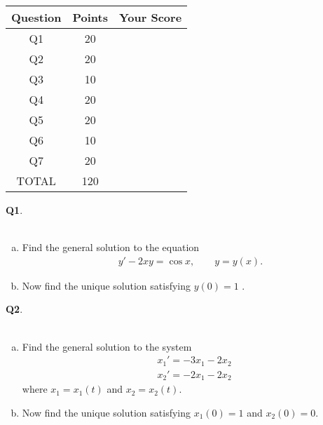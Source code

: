 \documentclass[12pt, oneside]{amsart}
\newcommand{\one}{20}
\newcommand{\two}{20}
\newcommand{\three}{10}
\newcommand{\four}{20}
\newcommand{\five}{20}
\newcommand{\six}{10}
\newcommand{\seven}{20}
\begin{document}
\begin{center}
    {\large
        \begin{tabular}{|c|c|c|}
            \hline
            \rule[-0.3cm]{0cm}{1cm}
            \textsf{Question} & \textsf{Points} &  \textsf{Your Score} \\
            \hline
            \hline
            \rule[-0.3cm]{0cm}{1cm}
            \textsf{Q1} & \one &\\
            \hline
            \rule[-0.3cm]{0cm}{1cm}
            \textsf{Q2} & \two &\\
            \hline
            \rule[-0.3cm]{0cm}{1cm}
            \textsf{Q3} & \three &\\
            \hline
            \rule[-0.3cm]{0cm}{1cm}
            \textsf{Q4} & \four &\\
            \hline
            \rule[-0.3cm]{0cm}{1cm}
            \textsf{Q5} & \five &\\
            \hline
            \rule[-0.3cm]{0cm}{1cm}
            \textsf{Q6} & \six &\\
            \hline
                        \rule[-0.3cm]{0cm}{1cm}
            \textsf{Q7} & \seven &\\
            \hline
            \rule[-0.3cm]{0cm}{1cm}
            \textsf{TOTAL} & 120 & \\
            \hline
        \end{tabular}
    } 

\end{center}

\vfill


\newpage
\noindent
\textbf{Q1}. \\ \\ 
\begin{enumerate}[a)]
    \item
Find the general solution to the equation
\begin{equation*}
\begin{split}
y' - 2xy = \cos x, \qquad y = y(x).
\end{split}
\end{equation*}


\vspace{5in}
\item
    Now find the unique solution satisfying $y(0) = 1$ .
\end{enumerate}

\newpage
\noindent
\textbf{Q2}. \\ \\ 
\begin{enumerate}[a)]
    \item
Find the general solution to the system
\begin{equation*}
\begin{split}
& x_1' = -3x_1 - 2x_2
\\
& x_2' = -2x_1 - 2 x_2
\end{split}
\end{equation*}
where $x_1 = x_1(t)$ and $x_2 = x_2(t)$.
\vspace{5in}
\item
    Now find the unique solution satisfying $x_1(0) = 1$ and $x_2(0) = 0$. 
\end{enumerate}
\end{document}
